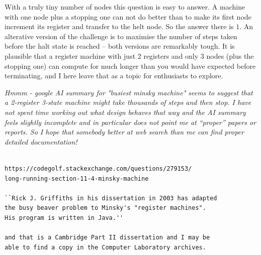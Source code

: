 With a truly tiny number of nodes this question is easy to answer. A
machine with one node plus a stopping one can not do better than to
make its first node increment its register and transfer to the helt node.
So the answer there is $1$. An alterative version of the challenge is to
maximise the number of steps taken before the halt state is reached --
both versions are remarkably tough. It is plausible that a register
machine with just 2 registers and only 3 nodes (plus the stopping one)
can compute for much longer than you would have expected before
terminating, and I here leave that as a topic for enthusiasts to explore.

{\em Hmmm - google AI summary for "busiest minsky machine" seems to
suggest that a 2-register 3-state machine might take thousands of
steps and then stop. I have not spent time working out what design
behaves that way and the AI summary feels slightly incomplete and in
particular does not point me at ``proper'' papers or reports. So I hope that
somebody better at web search than me can find proper detailed documentation!
\begin{verbatim}

https://codegolf.stackexchange.com/questions/279153/
long-running-section-11-4-minsky-machine

``Rick J. Griffiths in his dissertation in 2003 has adapted
the busy beaver problem to Minsky's "register machines".
His program is written in Java.''

and that is a Cambridge Part II dissertation and I may be
able to find a copy in the Computer Laboratory archives.

\end{verbatim}
}


